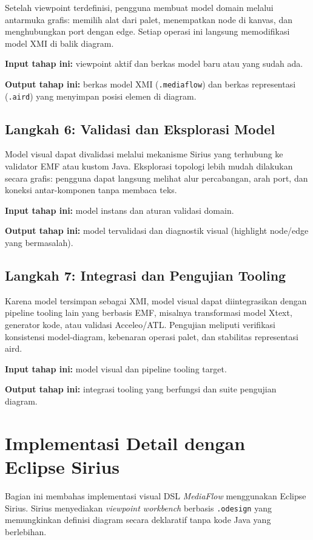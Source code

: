 Setelah viewpoint terdefinisi, pengguna membuat model domain melalui antarmuka grafis: memilih alat dari palet, menempatkan node di kanvas, dan menghubungkan port dengan edge. Setiap operasi ini langsung memodifikasi model XMI di balik diagram.

\textbf{Input tahap ini:} viewpoint aktif dan berkas model baru atau yang sudah ada.

\textbf{Output tahap ini:} berkas model XMI (\texttt{.mediaflow}) dan berkas representasi (\texttt{.aird}) yang menyimpan posisi elemen di diagram.

\subsection{Langkah 6: Validasi dan Eksplorasi Model}

Model visual dapat divalidasi melalui mekanisme Sirius yang terhubung ke validator EMF atau kustom Java. Eksplorasi topologi lebih mudah dilakukan secara grafis: pengguna dapat langsung melihat alur percabangan, arah port, dan koneksi antar-komponen tanpa membaca teks.

\textbf{Input tahap ini:} model instans dan aturan validasi domain.

\textbf{Output tahap ini:} model tervalidasi dan diagnostik visual (highlight node/edge yang bermasalah).

\subsection{Langkah 7: Integrasi dan Pengujian Tooling}

Karena model tersimpan sebagai XMI, model visual dapat diintegrasikan dengan pipeline tooling lain yang berbasis EMF, misalnya transformasi model Xtext, generator kode, atau validasi Acceleo/ATL. Pengujian meliputi verifikasi konsistensi model-diagram, kebenaran operasi palet, dan stabilitas representasi aird.

\textbf{Input tahap ini:} model visual dan pipeline tooling target.

\textbf{Output tahap ini:} integrasi tooling yang berfungsi dan suite pengujian diagram.

\section{Implementasi Detail dengan Eclipse Sirius}

Bagian ini membahas implementasi visual DSL \textit{MediaFlow} menggunakan Eclipse Sirius. Sirius menyediakan \textit{viewpoint workbench} berbasis \texttt{.odesign} yang memungkinkan definisi diagram secara deklaratif tanpa kode Java yang berlebihan.

